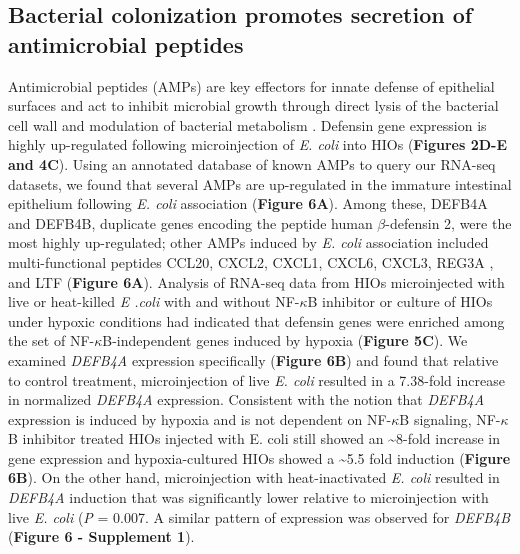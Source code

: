 \documentclass[9pt,lineo]{elife}
\begin{document}
\subsection*{{\bfseries\sffamily } Bacterial colonization promotes secretion of antimicrobial peptides}
\label{sec:orgheadline8}
Antimicrobial peptides (AMPs) are key effectors for innate defense of epithelial surfaces \citep{Muniz:2012} and act to inhibit microbial growth through direct lysis of the bacterial cell wall and modulation of bacterial metabolism  \citep{Ganz:2003,Bevins:2011,O'Neil:2003,Vora:2004,Brogden:2005}. Defensin gene expression is highly up-regulated following microinjection of \emph{E. coli} into HIOs (\textbf{Figures 2D-E and 4C}). Using an annotated database of known AMPs \citep{Wang:2016} to query our RNA-seq datasets, we found that several AMPs are up-regulated in the immature intestinal epithelium following \emph{E. coli} association (\textbf{Figure 6A}). Among these, DEFB4A and DEFB4B, duplicate genes encoding the peptide human \(\beta\)-defensin 2, were the most highly up-regulated; other AMPs induced by \emph{E. coli} association included multi-functional peptides CCL20, CXCL2, CXCL1, CXCL6, CXCL3, REG3A \citep{Cash:2006}, and LTF (\textbf{Figure 6A}). Analysis of RNA-seq data from HIOs microinjected with live or heat-killed \emph{E .coli} with and without NF-\(\kappa\)B inhibitor or culture of HIOs under hypoxic conditions had indicated that defensin genes were enriched among the set of NF-\(\kappa\)B-independent genes induced by hypoxia (\textbf{Figure 5C}). We examined \emph{DEFB4A} expression specifically (\textbf{Figure 6B}) and found that relative to control treatment, microinjection of live \emph{E. coli} resulted in a 7.38-fold increase in normalized \emph{DEFB4A} expression. Consistent with the notion that \emph{DEFB4A} expression is induced by hypoxia and is not dependent on NF-\(\kappa\)B signaling, NF-\(\kappa\)B inhibitor treated HIOs injected with E. coli still showed an \textasciitilde{}8-fold increase in gene expression and hypoxia-cultured HIOs showed a \textasciitilde{}5.5 fold induction (\textbf{Figure 6B}). On the other hand, microinjection with heat-inactivated \emph{E. coli} resulted in \emph{DEFB4A} induction that was significantly lower relative to microinjection with live \emph{E. coli} (\emph{P} = 0.007. A similar pattern of expression was observed for \emph{DEFB4B} (\textbf{Figure 6 - Supplement 1}).
\end{document}
